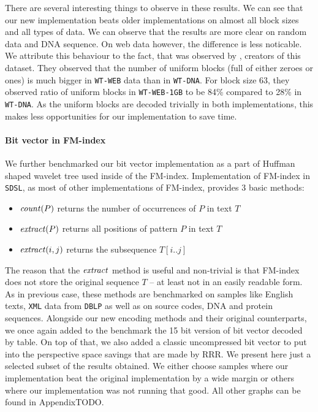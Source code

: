There are several interesting things to observe in these results. We can see that our new implementation
beats older implementations on almost all block sizes and all types of data. We can observe that the
results are more clear on random data and DNA sequence. On web data however, the difference is less
noticable. We attribute this behaviour to the fact, that was observed by \cite{gog2014optimized},
creators of this dataset. They observed that the number of uniform blocks (full of either zeroes or ones)
is much bigger in \texttt{WT-WEB} data than in \texttt{WT-DNA}. For block size 63, they observed ratio of
uniform blocks in \texttt{WT-WEB-1GB} to be 84\% compared to 28\% in \texttt{WT-DNA}. As the uniform
blocks are decoded trivially in both implementations, this makes less opportunities for our implementation
to save time.

\paragraph{Bit vector in FM-index}

We further benchmarked our bit vector implementation as a part of Huffman shaped wavelet tree
used inside of the FM-index. Implementation of FM-index in \texttt{SDSL}, as most of other
implementations of FM-index, provides 3 basic methods:

\begin{itemize}
	\item $\mathit{count}(P)$ returns the number of occurrences of $P$ in text $T$
	\item $\mathit{extract}(P)$ returns all positions of pattern $P$ in text $T$
	\item $\mathit{extract}(i, j)$ returns the subsequence $T[i..j]$
\end{itemize}

The reason that the $\mathit{extract}$ method is useful and non-trivial is that FM-index
does not store the original sequence $T$ -- at least not in an easily readable form.
As in previous case, these methods are benchmarked on samples like English texts, \texttt{XML}
data from \texttt{DBLP} as well as on source codes, DNA and protein sequences.
Alongside our new encoding methods and their original counterparts, we once again added
to the benchmark the 15 bit version of bit vector decoded by table. On top of that, we
also added a classic uncompressed bit vector to put into the perspective space savings that
are made by RRR. We present here just a selected subset of the results obtained. We either
choose samples where our implementation beat the original implementation by a wide margin
or others where our implementation was not running that good. All other graphs can be found
in AppendixTODO.

